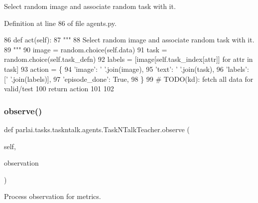 \begin{DoxyVerb}Select random image and associate random task with it.
\end{DoxyVerb}
 

Definition at line 86 of file agents.\+py.


\begin{DoxyCode}
86     \textcolor{keyword}{def }act(self):
87         \textcolor{stringliteral}{"""}
88 \textcolor{stringliteral}{        Select random image and associate random task with it.}
89 \textcolor{stringliteral}{        """}
90         image = random.choice(self.data)
91         task = random.choice(self.task\_defn)
92         labels = [image[self.task\_index[attr]] \textcolor{keywordflow}{for} attr \textcolor{keywordflow}{in} task]
93         action = \{
94             \textcolor{stringliteral}{'image'}: \textcolor{stringliteral}{' '}.join(image),
95             \textcolor{stringliteral}{'text'}: \textcolor{stringliteral}{' '}.join(task),
96             \textcolor{stringliteral}{'labels'}: [\textcolor{stringliteral}{' '}.join(labels)],
97             \textcolor{stringliteral}{'episode\_done'}: \textcolor{keyword}{True},
98         \}
99         \textcolor{comment}{# TODO(kd): fetch all data for valid/test}
100         \textcolor{keywordflow}{return} action
101 
102 
\end{DoxyCode}
\mbox{\label{classparlai_1_1tasks_1_1taskntalk_1_1agents_1_1TaskNTalkTeacher_a7c57cabccc60e4d52f2d73667006a3b3}} 
\subsubsection{\texorpdfstring{observe()}{observe()}}
{\footnotesize\ttfamily def parlai.\+tasks.\+taskntalk.\+agents.\+Task\+N\+Talk\+Teacher.\+observe (\begin{DoxyParamCaption}\item[{}]{self,  }\item[{}]{observation }\end{DoxyParamCaption})}

\begin{DoxyVerb}Process observation for metrics.
\end{DoxyVerb}
 

